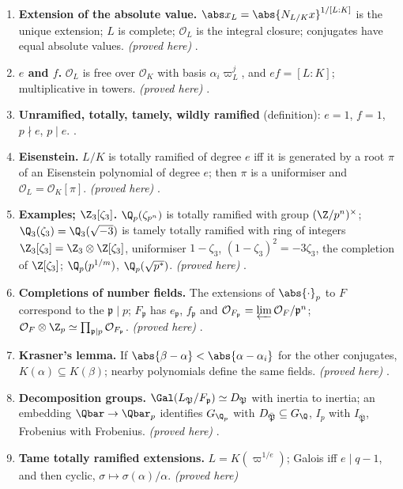 \begin{enumerate}[label=\textbf{\thechapter.\arabic*}]
.
\item \textbf{Extension of the absolute value.} $\abs x_L=\abs{N_{L/K}x}^{1/[L:K]}$ is the unique extension; $L$ is complete; $\mathcal O_L$ is the integral closure; conjugates
have equal absolute values. \emph{(proved here)} .
\item \textbf{$e$ and $f$.} $\mathcal O_L$ is free over $\mathcal O_K$ with basis $\alpha_i\varpi_L^j$, and $ef=[L:K]$; multiplicative in towers. \emph{(proved here)} .
\item \textbf{Unramified, totally, tamely, wildly ramified} (definition): $e=1$, $f=1$, $p\nmid e$, $p\mid e$. .
\item \textbf{Eisenstein.} $L/K$ is totally ramified of degree $e$ iff it is generated by a root $\pi$ of an Eisenstein polynomial of degree $e$; then $\pi$ is a uniformiser
and $\mathcal O_L=\mathcal O_K[\pi]$. \emph{(proved here)} .
\item \textbf{Examples; $\Z_3[\zeta_3]$.} $\Q_p(\zeta_{p^n})$ is totally ramified with group $(\Z/p^n)^\times$; $\Q_3(\zeta_3)=\Q_3(\sqrt{-3})$ is tamely totally ramified with ring of
integers $\Z_3[\zeta_3]=\Z_3\otimes\Z[\zeta_3]$, uniformiser $1-\zeta_3$, $(1-\zeta_3)^2=-3\zeta_3$, the completion of $\Z[\zeta_3]$; $\Q_p(p^{1/m})$, $\Q_p(\sqrt{p^*})$.
\emph{(proved here)} .
\item \textbf{Completions of number fields.} The extensions of $\abs{\cdot}_p$ to $F$ correspond to the $\mathfrak p\mid p$; $F_{\mathfrak p}$ has $e_{\mathfrak p}$, $f_{\mathfrak p}$ and
$\mathcal O_{F_{\mathfrak p}}=\varprojlim\mathcal O_F/\mathfrak p^n$; $\mathcal O_F\otimes\Z_p\simeq\prod_{\mathfrak p\mid p}\mathcal O_{F_{\mathfrak p}}$. \emph{(proved here)}
.
\item \textbf{Krasner's lemma.} If $\abs{\beta-\alpha}<\abs{\alpha-\alpha_i}$ for the other conjugates, $K(\alpha)\subseteq K(\beta)$; nearby polynomials define the same fields.
\emph{(proved here)} .
\item \textbf{Decomposition groups.} $\Gal(L_{\mathfrak P}/F_{\mathfrak p})\simeq D_{\mathfrak P}$ with inertia to inertia; an embedding $\Qbar\to\Qbar_p$ identifies $G_{\Q_p}$ with
$D_{\bar{\mathfrak P}}\subseteq G_\Q$, $I_p$ with $I_{\bar{\mathfrak P}}$, Frobenius with Frobenius. \emph{(proved here)} .
\item \textbf{Tame totally ramified extensions.} $L=K(\varpi^{1/e})$; Galois iff $e\mid q-1$, and then cyclic, $\sigma\mapsto\sigma(\alpha)/\alpha$. \emph{(proved here)}

\end{enumerate}

